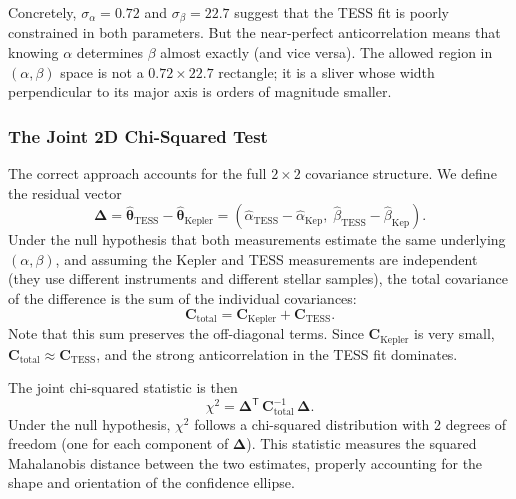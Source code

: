 Concretely, $\sigma_\alpha = 0.72$ and $\sigma_\beta = 22.7$ suggest
that the TESS fit is poorly constrained in both parameters.  But the
near-perfect anticorrelation means that knowing $\alpha$ determines
$\beta$ almost exactly (and vice versa).  The allowed region in
$(\alpha, \beta)$ space is not a $0.72 \times 22.7$ rectangle; it is
a sliver whose width perpendicular to its major axis is orders of
magnitude smaller.

\subsubsection{The Joint 2D Chi-Squared Test}

The correct approach accounts for the full $2 \times 2$ covariance
structure.  We define the residual vector
\begin{equation}
\boldsymbol{\Delta} =
  \hat{\boldsymbol{\theta}}_{\mathrm{TESS}} -
  \hat{\boldsymbol{\theta}}_{\mathrm{Kepler}} =
  (\hat{\alpha}_{\mathrm{TESS}} - \hat{\alpha}_{\mathrm{Kep}},\;
   \hat{\beta}_{\mathrm{TESS}} - \hat{\beta}_{\mathrm{Kep}}).
\label{eq:delta}
\end{equation}
Under the null hypothesis that both measurements estimate the same
underlying $(\alpha, \beta)$, and assuming the Kepler and TESS
measurements are independent (they use different instruments and
different stellar samples), the total covariance of the difference is
the sum of the individual covariances:
\begin{equation}
\mathbf{C}_{\mathrm{total}} =
  \mathbf{C}_{\mathrm{Kepler}} + \mathbf{C}_{\mathrm{TESS}}.
\label{eq:total_cov}
\end{equation}
Note that this sum preserves the off-diagonal terms.  Since
$\mathbf{C}_{\mathrm{Kepler}}$ is very small,
$\mathbf{C}_{\mathrm{total}} \approx \mathbf{C}_{\mathrm{TESS}}$, and
the strong anticorrelation in the TESS fit dominates.

The joint chi-squared statistic is then
\begin{equation}
\chi^2 = \boldsymbol{\Delta}^{\mathsf{T}} \,
  \mathbf{C}_{\mathrm{total}}^{-1} \, \boldsymbol{\Delta}.
\label{eq:chi2_joint}
\end{equation}
Under the null hypothesis, $\chi^2$ follows a chi-squared distribution
with 2 degrees of freedom (one for each component of
$\boldsymbol{\Delta}$).  This statistic measures the squared
Mahalanobis distance between the two estimates, properly accounting
for the shape and orientation of the confidence ellipse.

